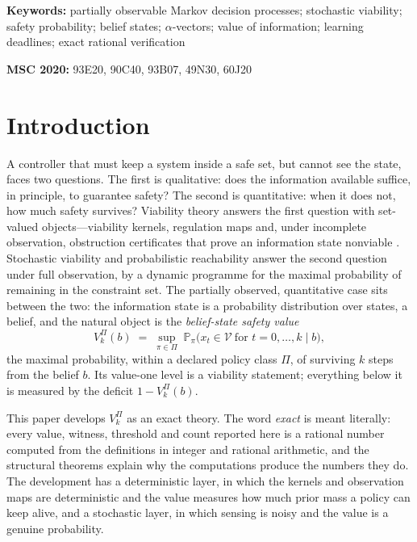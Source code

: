 \documentclass[11pt,a4paper]{article}
\theoremstyle{plain}
\theoremstyle{definition}
\theoremstyle{remark}
\newcommand{\Prob}{\mathbb{P}}
\newcommand{\calV}{\mathcal{V}}
\begin{document}
\begin{abstract}
below $(4\varepsilon(1-\varepsilon))^{n/2}$ at a cost of one unit of floor margin per reading. A contamination operator interpolates exactly between the expected and worst-case readings at one stage, but not across stages, and admits a closed form on the delayed class. Every statement is regenerated from the definitions by a deterministic exact-arithmetic script; the support identity, the stabilization count and the rationality of the $\alpha$-vectors are additionally machine-checked in Lean~4.
\end{abstract}

\medskip
\noindent\textbf{Keywords:} partially observable Markov decision processes; stochastic viability; safety probability; belief states; $\alpha$-vectors; value of information; learning deadlines; exact rational verification

\medskip
\noindent\textbf{MSC 2020:} 93E20, 90C40, 93B07, 49N30, 60J20

\section{Introduction}\label{sec:intro}

A controller that must keep a system inside a safe set, but cannot see the state, faces two questions. The first is qualitative: does the information available suffice, in principle, to guarantee safety? The second is quantitative: when it does not, how much safety survives? Viability theory answers the first question with set-valued objects---viability kernels, regulation maps and, under incomplete observation, obstruction certificates that prove an information state nonviable \cite{Aubin1991,Veliov1993,Doyen2000,Abaee2026calc}. Stochastic viability \cite{DeLaraDoyen2008,DoyenDeLara2010} and probabilistic reachability \cite{Abate2008} answer the second question under full observation, by a dynamic programme for the maximal probability of remaining in the constraint set. The partially observed, quantitative case sits between the two: the information state is a probability distribution over states, a belief, and the natural object is the \emph{belief-state safety value}
\[
V^{\Pi}_{k}(b)\;=\;\sup_{\pi\in\Pi}\;\Prob_{\pi}\bigl(x_t\in\calV\ \text{for } t=0,\dots,k\;\big|\;b\bigr),
\]
the maximal probability, within a declared policy class $\Pi$, of surviving $k$ steps from the belief $b$. Its value-one level is a viability statement; everything below it is measured by the deficit $1-V^{\Pi}_k(b)$.

This paper develops $V^{\Pi}_k$ as an exact theory. The word \emph{exact} is meant literally: every value, witness, threshold and count reported here is a rational number computed from the definitions in integer and rational arithmetic, and the structural theorems explain why the computations produce the numbers they do. The development has a deterministic layer, in which the kernels and observation maps are deterministic and the value measures how much prior mass a policy can keep alive, and a stochastic layer, in which sensing is noisy and the value is a genuine probability.
\end{document}
